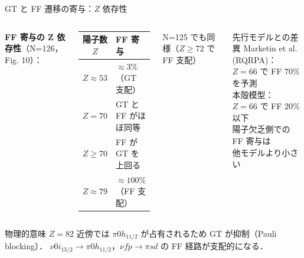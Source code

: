 \documentclass[aspectratio=169,12pt]{beamer}
\begin{document}
\begin{frame}{GT と FF 遷移の寄与：$Z$ 依存性}
  \begin{columns}
    \textbf{FF 寄与の Z 依存性}（N=126，Fig. 10）：
    \begin{center}
    \begin{tabular}{cl}
      \toprule
      陽子数 $Z$ & FF 寄与 \\
      \midrule
      $Z \approx 53$ & $\approx 3\%$（GT 支配）\\
      $Z = 70$ & GT と FF がほぼ同等 \\
      $Z \geq 70$ & FF が GT を上回る \\
      $Z \approx 79$ & $\approx 100\%$（FF 支配）\\
      \bottomrule
    \end{tabular}
    \end{center}
    N=125 でも同様（$Z \geq 72$ で FF 支配）

    \begin{block}{先行モデルとの差異}
      Marketin et al. (RQRPA)：\\
      $Z=66$ で FF $70\%$を予測\\[4pt]
      本殻模型：\\
      $Z=66$ で FF $20\%$ 以下\\[4pt]
      \alert{陽子欠乏側での FF 寄与は\\他モデルより小さい}
    \end{block}
  \end{columns}

  \begin{alertblock}{物理的意味}
    $Z=82$ 近傍では $\pi 0h_{11/2}$ が占有されるため GT が抑制（Pauli blocking）．
    $\nu 0i_{13/2} \to \pi 0h_{11/2}$，$\nu fp \to \pi sd$ の FF 経路が支配的になる．
  \end{alertblock}
\end{frame}
\end{document}

